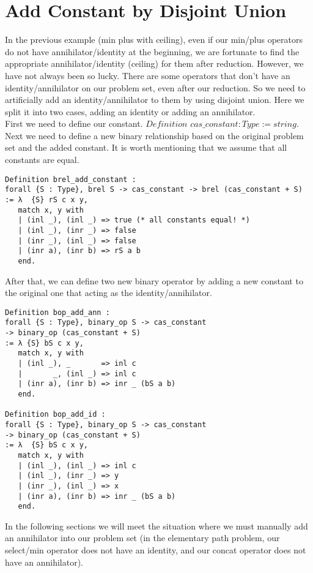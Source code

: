 \documentclass[a4paper,12pt,twoside,openright]{report}
\begin{document}
\section{Add Constant by Disjoint Union}
In the previous example (min plus with ceiling), even if our min/plus operators do not have annihilator/identity at the beginning, we are fortunate to find the appropriate annihilator/identity (ceiling) for them after reduction.
However, we have not always been so lucky. 
There are some operators that don't have an identity/annihilator on our problem set, even after our reduction. So we need to artificially add an identity/annihilator to them by using disjoint union. Here we split it into two cases, adding an identity or adding an annihilator.\\
First we need to define our constant. 
$Definition$ $cas\_constant : Type          := string.   $\\
Next we need to define a new binary relationship based on the original problem set and the added constant. It is worth mentioning that we assume that all constants are equal.
\begin{lstlisting}
Definition brel_add_constant : 
forall {S : Type}, brel S -> cas_constant -> brel (cas_constant + S)
:= λ  {S} rS c x y, 
   match x, y with
   | (inl _), (inl _) => true (* all constants equal! *) 
   | (inl _), (inr _) => false 
   | (inr _), (inl _) => false 
   | (inr a), (inr b) => rS a b 
   end.
\end{lstlisting}
After that, we can define two new binary operator by adding a new constant to the original one that acting as the identity/annihilator.
\begin{lstlisting}
Definition bop_add_ann : 
forall {S : Type}, binary_op S -> cas_constant 
-> binary_op (cas_constant + S)
:= λ {S} bS c x y, 
   match x, y with
   | (inl _), _       => inl c
   |       _, (inl _) => inl c
   | (inr a), (inr b) => inr _ (bS a b)
   end.

Definition bop_add_id : 
forall {S : Type}, binary_op S -> cas_constant 
-> binary_op (cas_constant + S)
:= λ  {S} bS c x y, 
   match x, y with
   | (inl _), (inl _) => inl c 
   | (inl _), (inr _) => y
   | (inr _), (inl _) => x
   | (inr a), (inr b) => inr _ (bS a b)
   end.
\end{lstlisting}
In the following sections we will meet the situation where we must manually add an annihilator into our problem set (in the elementary path problem, our select/min operator does not have an identity, and our concat operator does not have an annihilator).
\end{document}
